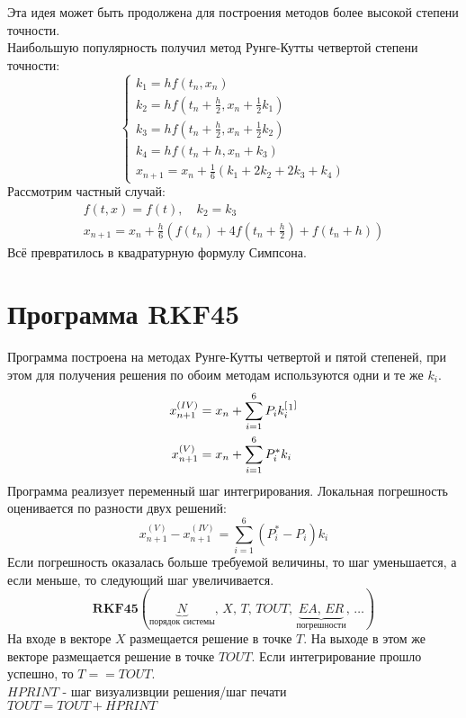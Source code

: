 \documentclass[a4paper,11pt]{article}
\begin{document}
Эта идея может быть продолжена для построения методов более высокой степени точности. \\
Наибольшую популярность получил метод Рунге-Кутты четвертой степени точности:
\begin{equation}
  \begin{cases}
    k_1 = hf(t_n, x_n) \\
    k_2 = hf(t_n + \frac{h}{2}, x_n + \frac{1}{2}k_1) \\
    k_3 = hf(t_n + \frac{h}{2}, x_n + \frac{1}{2}k_2) \\
    k_4 = hf(t_n + h, x_n + k_3) \\
    x_{n+1} = x_n + \frac{1}{6}(k_1 + 2k_2 + 2k_3 + k_4)
  \end{cases}
  \label{eq:RKM4}
\end{equation}
Рассмотрим частный случай:
\begin{gather*}
  f(t, x) = f(t),\quad k_2 = k_3 \\
  x_{n+1} = x_n + \frac{h}{6}(f(t_n) + 4f(t_n+\frac{h}{2}) + f(t_n + h))
\end{gather*}
Всё превратилось в квадратурную формулу Симпсона.

\section{Программа RKF45}
Программа построена на методах Рунге-Кутты четвертой и пятой степеней, при этом для получения решения по обоим методам используются одни и те же $k_i$. \\
\begin{align*}
  x_{n+1}^{(IV)} &= x_n + \sum_{i=1}^6 P_i k_i ^[\footnotemark^] \\
  x_{n+1}^{(V)}  &= x_n + \sum_{i=1}^6 P_i^* k_i
\end{align*}
Программа реализует переменный шаг интегрирования. Локальная погрешность оценивается по разности двух решений:
\[x_{n+1}^{(V)} - x_{n+1}^{(IV)} = \sum_{i=1}^6 (P_i^* - P_i)k_i\]
Если погрешность оказалась больше требуемой величины, то шаг уменьшается, а если меньше, то следующий шаг увеличивается.\footnotemark
{}
\[\textbf{RKF45}(\underbrace{N}_{\text{порядок системы}},\, X,\, T,\, TOUT,\, \underbrace{EA,\, ER}_{\text{погрешности}},\, \dots)\]
На входе в векторе $X$ размещается решение в точке $T$. На выходе в этом же векторе размещается решение в точке $TOUT$. Если интегрирование прошло успешно,
  то $T == TOUT$. \\
  $HPRINT$ - шаг визуализвции решения/шаг печати \\
  $TOUT = TOUT + HPRINT$
\end{document}
